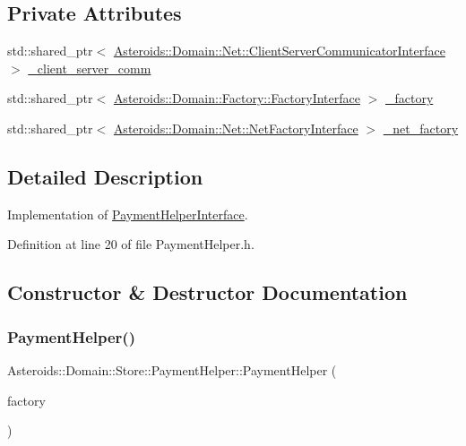 \subsection*{Private Attributes}
\begin{DoxyCompactItemize}
\item 
std\+::shared\+\_\+ptr$<$ \hyperlink{classAsteroids_1_1Domain_1_1Net_1_1ClientServerCommunicatorInterface}{Asteroids\+::\+Domain\+::\+Net\+::\+Client\+Server\+Communicator\+Interface} $>$ \hyperlink{classAsteroids_1_1Domain_1_1Store_1_1PaymentHelper_aada704df6830a51f1f40f5785730a5f3}{\+\_\+client\+\_\+server\+\_\+comm}
\item 
std\+::shared\+\_\+ptr$<$ \hyperlink{classAsteroids_1_1Domain_1_1Factory_1_1FactoryInterface}{Asteroids\+::\+Domain\+::\+Factory\+::\+Factory\+Interface} $>$ \hyperlink{classAsteroids_1_1Domain_1_1Store_1_1PaymentHelper_aa4aea2ad9b1de1b304bf8d3a08c15b4a}{\+\_\+factory}
\item 
std\+::shared\+\_\+ptr$<$ \hyperlink{classAsteroids_1_1Domain_1_1Net_1_1NetFactoryInterface}{Asteroids\+::\+Domain\+::\+Net\+::\+Net\+Factory\+Interface} $>$ \hyperlink{classAsteroids_1_1Domain_1_1Store_1_1PaymentHelper_adcd8cedaf305228ab6d938551f3fbef3}{\+\_\+net\+\_\+factory}
\end{DoxyCompactItemize}


\subsection{Detailed Description}
Implementation of \hyperlink{classAsteroids_1_1Domain_1_1Store_1_1PaymentHelperInterface}{Payment\+Helper\+Interface}. 

Definition at line 20 of file Payment\+Helper.\+h.



\subsection{Constructor \& Destructor Documentation}
\mbox{\label{classAsteroids_1_1Domain_1_1Store_1_1PaymentHelper_a76969f028c9cbad646a492bb38e945b5}} 
\subsubsection{\texorpdfstring{Payment\+Helper()}{PaymentHelper()}}
{\footnotesize\ttfamily Asteroids\+::\+Domain\+::\+Store\+::\+Payment\+Helper\+::\+Payment\+Helper (\begin{DoxyParamCaption}\item[{std\+::shared\+\_\+ptr$<$ \hyperlink{classAsteroids_1_1Domain_1_1Factory_1_1FactoryInterface}{Asteroids\+::\+Domain\+::\+Factory\+::\+Factory\+Interface} $>$}]{factory }\end{DoxyParamCaption})}



